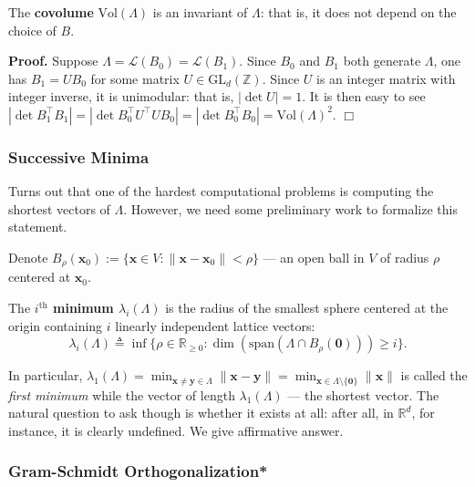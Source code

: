 \documentclass{template}
\newcommand{\qedwhite}{\hfill \ensuremath{\Box}}
\begin{document}
\begin{proposition}
    The \textbf{covolume} $\text{Vol}(\Lambda)$ is an invariant of $\Lambda$:
    that is, it does not depend on the choice of $B$.
\end{proposition}

\textbf{Proof.} Suppose $\Lambda = \mathcal{L}(B_0) = \mathcal{L}(B_1)$. Since
$B_0$ and $B_1$ both generate $\Lambda$, one has $B_1 = UB_0$ for some matrix $U
\in \text{GL}_d(\mathbb{Z})$. Since $U$ is an integer matrix with integer
inverse, it is unimodular: that is, $|\det U| = 1$. It is then easy to see
$|\det B_1^{\top}B_1| = |\det B_0^{\top}U^{\top}UB_0| = |\det B_0^{\top}B_0| =
\text{Vol}(\Lambda)^2$. \qedwhite

\subsubsection{Successive Minima}

Turns out that one of the hardest computational problems is computing the
shortest vectors of $\Lambda$. However, we need some preliminary work to
formalize this statement. 

Denote $B_{\rho}(\mathbf{x}_0) := \{\mathbf{x} \in V:
\|\mathbf{x}-\mathbf{x}_0\|<\rho\}$ --- an open ball in $V$ of radius $\rho$
centered at $\mathbf{x}_0$. 

\begin{definition}
    The \textbf{$i^{\text{th}}$ minimum $\lambda_i(\Lambda)$} is the radius 
    of the smallest sphere centered at the origin containing $i$ linearly 
    independent lattice vectors:
    \begin{equation*}
        \lambda_i(\Lambda) \triangleq \inf \{\rho \in \mathbb{R}_{\geq 0}: \dim(\text{span}(\Lambda \cap B_{\rho}(\mathbf{0}))) \geq i\}.
    \end{equation*}
\end{definition}

In particular, $\lambda_1(\Lambda) = \min_{\mathbf{x} \neq \mathbf{y} \in
\Lambda}\|\mathbf{x}-\mathbf{y}\| = \min_{\mathbf{x} \in
\Lambda\setminus\{\mathbf{0}\}}\|\mathbf{x}\|$ is called the \textit{first
minimum} while the vector of length $\lambda_1(\Lambda)$ --- the shortest
vector. The natural question to ask though is whether it exists at all: after
all, in $\mathbb{R}^d$, for instance, it is clearly undefined. We give
affirmative answer.

\subsubsection*{Gram-Schmidt Orthogonalization*}
\end{document}
